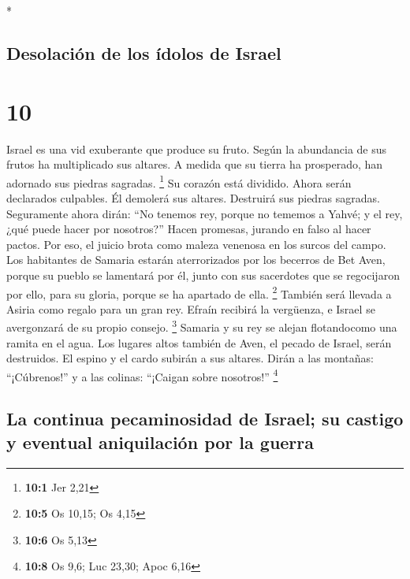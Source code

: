 \begin{paracol}{2}
\begin{otherlanguage}{english}
\end{otherlanguage}

\switchcolumn[0]*

\hypertarget{desolaciuxf3n-de-los-uxeddolos-de-israel}{%
\subsection{Desolación de los ídolos de
Israel}\label{desolaciuxf3n-de-los-uxeddolos-de-israel}}

\hypertarget{section-18}{%
\section{10}\label{section-18}}

 Israel es una vid exuberante que produce su fruto. Según
la abundancia de sus frutos ha multiplicado sus altares. A medida que su
tierra ha prosperado, han adornado sus piedras sagradas. \footnote{\textbf{10:1}
  Jer 2,21}  Su corazón está dividido. Ahora serán
declarados culpables. Él demolerá sus altares. Destruirá sus piedras
sagradas.  Seguramente ahora dirán: ``No tenemos rey,
porque no tememos a Yahvé; y el rey, ¿qué puede hacer por nosotros?''
 Hacen promesas, jurando en falso al hacer pactos. Por
eso, el juicio brota como maleza venenosa en los surcos del campo.
 Los habitantes de Samaria estarán aterrorizados por los
becerros de Bet Aven, porque su pueblo se lamentará por él, junto con
sus sacerdotes que se regocijaron por ello, para su gloria, porque se ha
apartado de ella. \footnote{\textbf{10:5} Os 10,15; Os 4,15}
 También será llevada a Asiria como regalo para un gran
rey. Efraín recibirá la vergüenza, e Israel se avergonzará de su propio
consejo. \footnote{\textbf{10:6} Os 5,13}  Samaria y su
rey se alejan flotandocomo una ramita en el agua.  Los
lugares altos también de Aven, el pecado de Israel, serán destruidos. El
espino y el cardo subirán a sus altares. Dirán a las montañas:
``¡Cúbrenos!'' y a las colinas: ``¡Caigan sobre nosotros!'' \footnote{\textbf{10:8}
  Os 9,6; Luc 23,30; Apoc 6,16}

\hypertarget{la-continua-pecaminosidad-de-israel-su-castigo-y-eventual-aniquilaciuxf3n-por-la-guerra}{%
\subsection{La continua pecaminosidad de Israel; su castigo y eventual
aniquilación por la
guerra}\label{la-continua-pecaminosidad-de-israel-su-castigo-y-eventual-aniquilaciuxf3n-por-la-guerra}}


\end{paracol}
